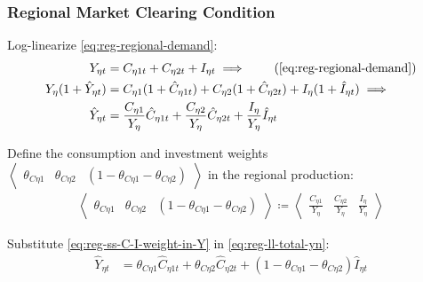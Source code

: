 \documentclass[../thesis.tex]{subfiles}
\begin{document}

\subsubsection*{Regional Market Clearing Condition}

Log-linearize \ref{eq:reg-regional-demand}:
\begin{align}
	Y_{\eta t} &= C_{\eta 1 t} + C_{\eta 2 t} + I_{\eta t} \implies \tag{\ref{eq:reg-regional-demand}} \\
	Y_{\eta} (1 +\hat{Y}_{\eta t}) &= C_{\eta 1} (1 +\hat{C}_{\eta 1 t}) + C_{\eta 2} (1 +\hat{C}_{\eta 2 t}) + I_{\eta} (1 +\hat{I}_{\eta t}) \implies \nonumber \\
	\hat{Y}_{\eta t} &= \frac{C_{\eta 1}}{Y_{\eta}} \hat{C}_{\eta 1 t} + \frac{C_{\eta 2}}{Y_{\eta}} \hat{C}_{\eta 2 t} + \frac{I_{\eta}}{Y_{\eta}} \hat{I}_{\eta t} \label{eq:reg-ll-total-yn}
\end{align}

Define the consumption and investment weights $\left\langle \begin{smallmatrix} \theta_{C\eta 1} & \theta_{C\eta 2} & (1 - \theta_{C\eta 1} - \theta_{C\eta 2}) \end{smallmatrix} \right\rangle$ in the regional production:
\begin{align}
	\label{eq:reg-ss-C-I-weight-in-Y}
	\left\langle \begin{matrix} \theta_{C\eta 1} & \theta_{C\eta 2} & (1 - \theta_{C\eta 1} - \theta_{C\eta 2}) \end{matrix} \right\rangle \coloneq \left\langle \begin{matrix} \frac{C_{\eta 1}}{Y_{\eta}} & \frac{C_{\eta 2}}{Y_{\eta}} & \frac{I_{\eta}}{Y_{\eta}} \end{matrix} \right\rangle
\end{align}

Substitute \ref{eq:reg-ss-C-I-weight-in-Y} in \ref{eq:reg-ll-total-yn}:
\begin{align}
	\hat{Y}_{\eta t} &= \theta_{C\eta 1} \hat{C}_{\eta 1 t} + \theta_{C\eta 2} \hat{C}_{\eta 2 t} + (1 - \theta_{C\eta 1} - \theta_{C\eta 2}) \hat{I}_{\eta t} \label{eq:reg-ll-total-yn-2}
\end{align}

\newpage

\end{document}
